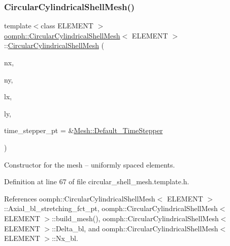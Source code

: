 \subsubsection{\texorpdfstring{Circular\+Cylindrical\+Shell\+Mesh()}{CircularCylindricalShellMesh()}\hspace{0.1cm}{\footnotesize\ttfamily [1/3]}}
{\footnotesize\ttfamily template$<$class E\+L\+E\+M\+E\+NT $>$ \\
\hyperlink{classoomph_1_1CircularCylindricalShellMesh}{oomph\+::\+Circular\+Cylindrical\+Shell\+Mesh}$<$ E\+L\+E\+M\+E\+NT $>$\+::\hyperlink{classoomph_1_1CircularCylindricalShellMesh}{Circular\+Cylindrical\+Shell\+Mesh} (\begin{DoxyParamCaption}\item[{const unsigned \&}]{nx,  }\item[{const unsigned \&}]{ny,  }\item[{const double \&}]{lx,  }\item[{const double \&}]{ly,  }\item[{\hyperlink{classoomph_1_1TimeStepper}{Time\+Stepper} $\ast$}]{time\+\_\+stepper\+\_\+pt = {\ttfamily \&\hyperlink{classoomph_1_1Mesh_a12243d0fee2b1fcee729ee5a4777ea10}{Mesh\+::\+Default\+\_\+\+Time\+Stepper}} }\end{DoxyParamCaption})\hspace{0.3cm}{\ttfamily [inline]}}



Constructor for the mesh -- uniformly spaced elements. 



Definition at line 67 of file circular\+\_\+shell\+\_\+mesh.\+template.\+h.



References oomph\+::\+Circular\+Cylindrical\+Shell\+Mesh$<$ E\+L\+E\+M\+E\+N\+T $>$\+::\+Axial\+\_\+bl\+\_\+stretching\+\_\+fct\+\_\+pt, oomph\+::\+Circular\+Cylindrical\+Shell\+Mesh$<$ E\+L\+E\+M\+E\+N\+T $>$\+::build\+\_\+mesh(), oomph\+::\+Circular\+Cylindrical\+Shell\+Mesh$<$ E\+L\+E\+M\+E\+N\+T $>$\+::\+Delta\+\_\+bl, and oomph\+::\+Circular\+Cylindrical\+Shell\+Mesh$<$ E\+L\+E\+M\+E\+N\+T $>$\+::\+Nx\+\_\+bl.

\mbox{\label{classoomph_1_1CircularCylindricalShellMesh_a2382a9ed0cd210c7b697e6ba4f4e2b0b}} 
